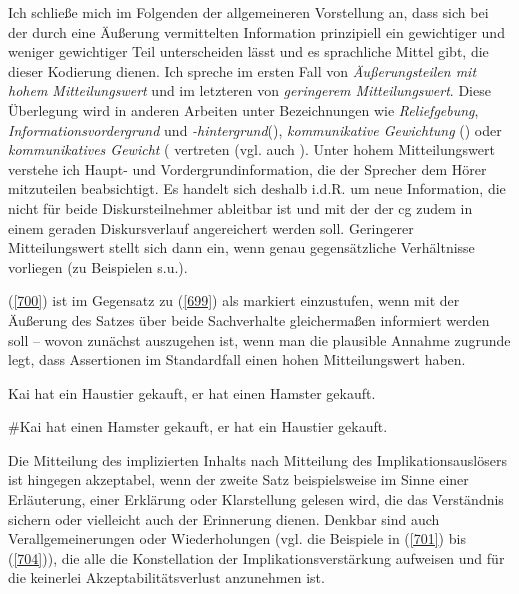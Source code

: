 Ich schließe mich im Folgenden der allgemeineren Vorstellung an, dass sich bei der durch eine Äußerung vermittelten Information prinzipiell ein gewichtiger und weniger gewichtiger Teil unterscheiden lässt und es sprachliche Mittel gibt, die dieser Kodierung dienen. Ich spreche im ersten Fall von \textit{Äußerungsteilen mit hohem Mitteilungswert} und im letzteren von \textit{geringerem Mitteilungswert}. Diese Überlegung wird in anderen Arbeiten unter Bezeichnungen wie  \textit{Reliefgebung}, \textit{Informationsvordergrund}  und \textit{-hintergrund}(\citealt{Hartmann1984}), \textit{kommunikative Gewichtung}  (\citealt{Brandt1994}) oder \textit{kommunikatives Gewicht} (\citealt{Hoffmann2002, Hoffmann2003} vertreten (vgl. auch \citealt{Reis1993}). Unter hohem Mitteilungswert verstehe ich Haupt- und Vordergrundinformation, die der Sprecher dem Hörer mitzuteilen beabsichtigt. Es handelt sich deshalb i.d.R. um neue Information, die nicht für beide Diskursteilnehmer ableitbar ist und mit der der cg zudem in einem geraden Diskursverlauf angereichert werden soll. Geringerer Mitteilungswert stellt sich dann ein, wenn genau gegensätzliche Verhältnisse vorliegen (zu Beispielen s.u.).

(\ref{700}) ist im Gegensatz zu (\ref{699}) als markiert einzustufen, wenn mit der Äußerung des Satzes über beide Sachverhalte gleichermaßen informiert werden soll – wovon zunächst auszugehen ist, wenn man die plausible Annahme zugrunde legt, dass Assertionen  im Standardfall einen hohen Mitteilungswert haben.

\begin{exe}
	\ex\label{699} 
	Kai hat ein Haustier gekauft, er hat einen Hamster gekauft.	
\end{exe}
\vspace{-0.65cm}
\begin{exe}
	\ex\label{700} 
	\#Kai hat einen Hamster gekauft, er hat ein Haustier gekauft.	
\end{exe}
Die Mitteilung des implizierten Inhalts nach Mitteilung des Implikationsauslösers ist  hingegen akzeptabel, wenn der zweite Satz beispielsweise im Sinne einer Erläuterung, einer Erklärung oder Klarstellung gelesen wird, die das Verständnis sichern oder vielleicht auch der Erinnerung dienen. Denkbar sind auch Verallgemeinerungen oder Wiederholungen (vgl. die Beispiele in (\ref{701}) bis (\ref{704})), die alle die Konstellation der Implikationsverstärkung aufweisen und für die keinerlei Akzeptabilitätsverlust anzunehmen ist.

